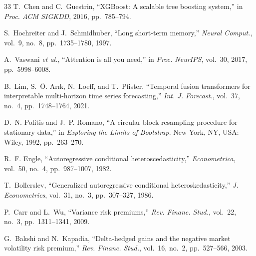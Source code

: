 \documentclass[conference]{IEEEtran}
\begin{document}
\begin{thebibliography}{33}
 T.~Chen and C.~Guestrin, ``XGBoost: A scalable tree boosting system,'' in \emph{Proc. ACM SIGKDD}, 2016, pp.~785--794.

 S.~Hochreiter and J.~Schmidhuber, ``Long short-term memory,'' \emph{Neural Comput.}, vol.~9, no.~8, pp.~1735--1780, 1997.

 A.~Vaswani \emph{et al.}, ``Attention is all you need,'' in \emph{Proc. NeurIPS}, vol.~30, 2017, pp.~5998--6008.

 B.~Lim, S.~\"O. Ar{\i}k, N.~Loeff, and T.~Pfister, ``Temporal fusion transformers for interpretable multi-horizon time series forecasting,'' \emph{Int. J. Forecast.}, vol.~37, no.~4, pp.~1748--1764, 2021.

 D.~N. Politis and J.~P. Romano, ``A circular block-resampling procedure for stationary data,'' in \emph{Exploring the Limits of Bootstrap}. New York, NY, USA: Wiley, 1992, pp.~263--270.

 R.~F. Engle, ``Autoregressive conditional heteroscedasticity,'' \emph{Econometrica}, vol.~50, no.~4, pp.~987--1007, 1982.

 T.~Bollerslev, ``Generalized autoregressive conditional heteroskedasticity,'' \emph{J. Econometrics}, vol.~31, no.~3, pp.~307--327, 1986.

 P.~Carr and L.~Wu, ``Variance risk premiums,'' \emph{Rev. Financ. Stud.}, vol.~22, no.~3, pp.~1311--1341, 2009.

 G.~Bakshi and N.~Kapadia, ``Delta-hedged gains and the negative market volatility risk premium,'' \emph{Rev. Financ. Stud.}, vol.~16, no.~2, pp.~527--566, 2003.
\end{thebibliography}
\end{document}

